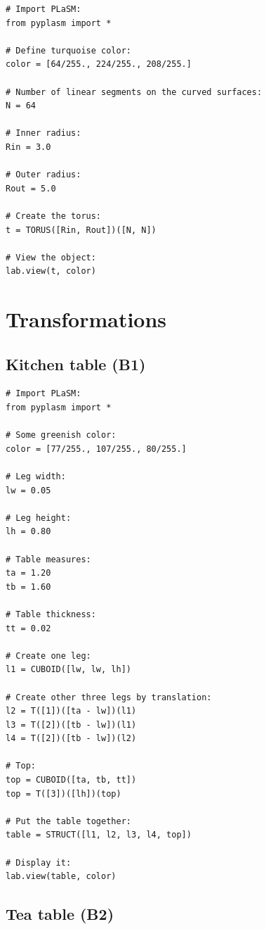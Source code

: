 \documentclass{article}
\begin{document}
\begin{verbatim}
# Import PLaSM:
from pyplasm import *

# Define turquoise color:
color = [64/255., 224/255., 208/255.]

# Number of linear segments on the curved surfaces:
N = 64

# Inner radius:
Rin = 3.0

# Outer radius:
Rout = 5.0

# Create the torus:
t = TORUS([Rin, Rout])([N, N])

# View the object:
lab.view(t, color)
\end{verbatim}





\section{Transformations}

\subsection{Kitchen table (B1)}

\begin{verbatim}
# Import PLaSM:
from pyplasm import *

# Some greenish color:
color = [77/255., 107/255., 80/255.]

# Leg width:
lw = 0.05

# Leg height:
lh = 0.80

# Table measures:
ta = 1.20
tb = 1.60

# Table thickness:
tt = 0.02

# Create one leg:
l1 = CUBOID([lw, lw, lh])

# Create other three legs by translation:
l2 = T([1])([ta - lw])(l1)
l3 = T([2])([tb - lw])(l1)
l4 = T([2])([tb - lw])(l2)

# Top:
top = CUBOID([ta, tb, tt])
top = T([3])([lh])(top)

# Put the table together:
table = STRUCT([l1, l2, l3, l4, top])

# Display it:
lab.view(table, color)
\end{verbatim}


\subsection{Tea table (B2)}
\end{document}
